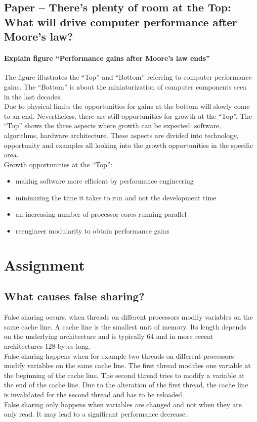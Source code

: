 \documentclass[runningheads]{llncs}
\begin{document}

\subsection {Paper – There’s plenty of room at the Top: What will drive computer performance after Moore’s law?}

\paragraph{Explain figure “Performance gains after Moore’s law ends”}
The figure illustrates the “Top” and “Bottom” referring to computer performance gains. 
The “Bottom” is about the miniaturization of computer components seen in the last decades. \\
Due to physical limits the opportunities for gains at the bottom will slowly come to an end.
 Nevertheless, there are still opportunities for growth at the “Top”. 
 The “Top” shows the three aspects where growth can be expected: software, algorithms, hardware architecture. 
 These aspects are divided into technology, opportunity and examples all looking into the growth opportunities in the specific area.
\\
Growth opportunities at the “Top”:
\begin{itemize}
	\item making software more efficient by performance engineering
	\item minimizing the time it takes to run and not the development time
	\item an increasing number of processor cores running parallel
	\item reengineer modularity to obtain performance gains
\end{itemize}


\section{Assignment}

\subsection{What causes false sharing?}
False sharing occurs, when threads on different processors modify variables on the same cache line. 
A cache line is the smallest unit of memory. Its length depends on the underlying architecture and is typically 64 and 
in more recent architectures 128 bytes long.
\\
False sharing happens when for example two threads on different processors modify variables on the same cache line. 
The first thread modifies one variable at the beginning of the cache line. 
The second thread tries to modify a variable at the end of the cache line. 
Due to the alteration of the first thread, the cache line is invalidated for the second thread and has to be reloaded.
\\
False sharing only happens when variables are changed and not when they are only read. It may lead to a significant performance decrease.
\end{document}
